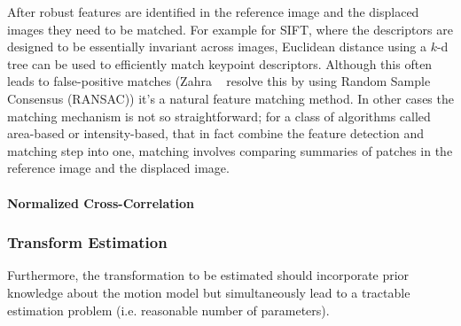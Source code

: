 After robust features are identified in the reference image and the displaced images they need to be matched.
%
For example for SIFT, where the descriptors are designed to be essentially invariant across images, Euclidean distance using a $k$-d tree can be used to efficiently match keypoint descriptors.
%
Although this often leads to false-positive matches (Zahra \etal~ resolve this by using Random Sample Consensus (RANSAC)) it's a natural feature matching method.
%
In other cases the matching mechanism is not so straightforward; for a class of algorithms called area-based or intensity-based, that in fact combine the feature detection and matching step into one, matching involves comparing summaries of patches in the reference image and the displaced image.

\paragraph{Normalized Cross-Correlation}

\subsubsection{Transform Estimation}
Furthermore, the transformation to be estimated should incorporate prior knowledge about the motion model but simultaneously lead to a tractable estimation problem (i.e. reasonable number of parameters).

